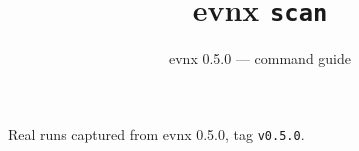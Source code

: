 \documentclass[aspectratio=169,10pt]{beamer}
\title{evnx \texttt{scan}}
\subtitle{evnx 0.5.0 — command guide}
\date{}
\begin{document}
\begin{frame}[plain]\titlepage
  \begin{center}\footnotesize
  \textcolor{evnxMuted}{Real runs captured from evnx 0.5.0, tag \texttt{v0.5.0}.}
  \end{center}
\end{frame}

\end{document}
